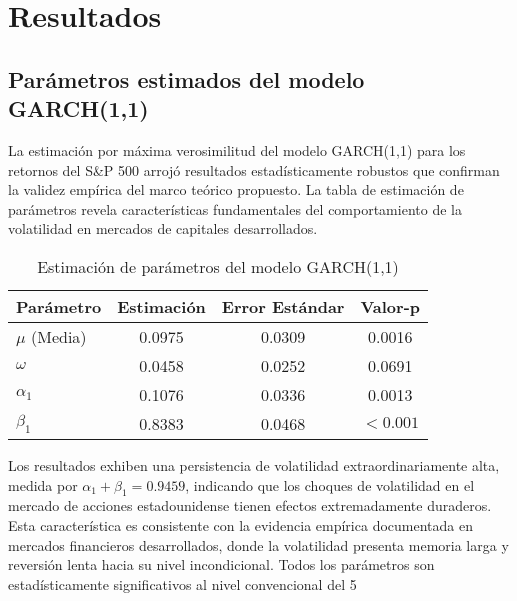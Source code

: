 \section{Resultados}

\subsection{Parámetros estimados del modelo GARCH(1,1)}

La estimación por máxima verosimilitud del modelo GARCH(1,1) para los retornos del S\&P 500 arrojó resultados estadísticamente robustos que confirman la validez empírica del marco teórico propuesto. La tabla de estimación de parámetros revela características fundamentales del comportamiento de la volatilidad en mercados de capitales desarrollados.

\begin{table}[hbt!]
\centering
\caption{Estimación de parámetros del modelo GARCH(1,1)}
\begin{tabular}{lccc}
\hline
\textbf{Parámetro} & \textbf{Estimación} & \textbf{Error Estándar} & \textbf{Valor-p} \\
\hline
$\mu$ (Media) & 0.0975 & 0.0309 & 0.0016 \\
$\omega$ & 0.0458 & 0.0252 & 0.0691 \\
$\alpha_1$ & 0.1076 & 0.0336 & 0.0013 \\
$\beta_1$ & 0.8383 & 0.0468 & $< 0.001$ \\
\hline
\end{tabular}
\label{tab:garch_params}
\end{table}

Los resultados exhiben una persistencia de volatilidad extraordinariamente alta, medida por $\alpha_1 + \beta_1 = 0.9459$, indicando que los choques de volatilidad en el mercado de acciones estadounidense tienen efectos extremadamente duraderos. Esta característica es consistente con la evidencia empírica documentada en mercados financieros desarrollados, donde la volatilidad presenta memoria larga y reversión lenta hacia su nivel incondicional. Todos los parámetros son estadísticamente significativos al nivel convencional del 5%

